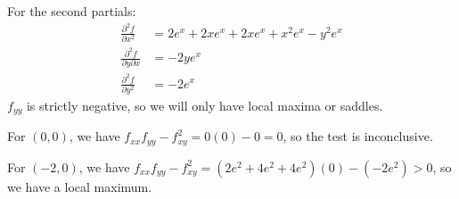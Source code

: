 \documentclass[letterpaper, 11pt]{article}
\begin{document}
\begin{enumerate}
For the second partials:
\begin{align*}
\frac{ \partial^2 f}{\partial x^2} &= 2e^x + 2xe^x + 2xe^x + x^2 e^x - y^2 e^x \\
\frac{ \partial^2 f}{\partial y \partial x} &= -2ye^x \\
\frac{ \partial^2 f}{\partial y^2 } &= -2e^x 
\end{align*}
$f_{yy}$ is strictly negative, so we will only have local maxima or saddles. 
\par For $(0,0)$, we have $f_{xx} f_{yy} - f_{xy}^2 = 0(0) - 0 = 0$, so the test is inconclusive. 
\par For $(-2,0)$, we have $f_{xx} f_{yy} - f_{xy}^2 = (2e^2 + 4e^2 + 4e^2)(0) - (-2e^2) > 0$, so we have a local maximum. 



\end{enumerate}
\end{document}
